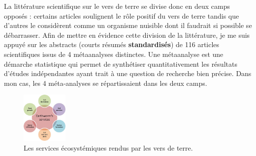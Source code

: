 \documentclass{book}
\begin{document}
La littérature scientifique sur le vers de terre se divise donc en deux camps opposés : certains articles soulignent le rôle positif du vers de terre tandis que d'autres le considèrent comme un organisme nuisible dont il faudrait si possible se débarrasser.  Afin de mettre en évidence cette division de la littérature, je me suis appuyé sur les abstracts (courts résumés \textbf{standardisés}) de 116 articles scientifiques issus de 4 métaanalyses distinctes. Une métaanalyse est une démarche statistique qui permet de synthétiser quantitativement les résultats d'études indépendantes ayant trait à une question de recherche bien précise. Dans mon cas, les 4 méta-analyses se répartissaient dans les deux camps.  





\noindent

\begin{figure}[htb] %
    \begin{center} %
        \includegraphics[width=0.2\textwidth]{EW_services.png}
        \caption{Les services écosystémiques rendus par les vers de terre.}\label{fig_wormsservices}
    \end{center}
\end{figure}
\end{document}
